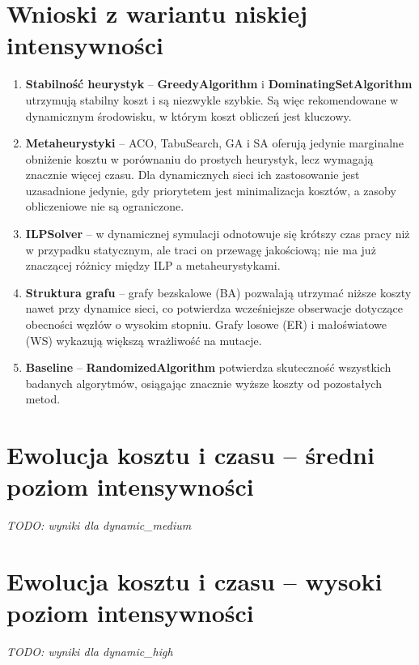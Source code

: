 \section{Wnioski z wariantu niskiej intensywności}

\begin{enumerate}
\item \textbf{Stabilność heurystyk} -- \textbf{GreedyAlgorithm} i \textbf{DominatingSetAlgorithm} utrzymują stabilny koszt i są niezwykle szybkie. Są więc rekomendowane w dynamicznym środowisku, w którym koszt obliczeń jest kluczowy.

\item \textbf{Metaheurystyki} -- ACO, TabuSearch, GA i SA oferują jedynie marginalne obniżenie kosztu w porównaniu do prostych heurystyk, lecz wymagają znacznie więcej czasu. Dla dynamicznych sieci ich zastosowanie jest uzasadnione jedynie, gdy priorytetem jest minimalizacja kosztów, a zasoby obliczeniowe nie są ograniczone.

\item \textbf{ILPSolver} -- w dynamicznej symulacji odnotowuje się krótszy czas pracy niż w przypadku statycznym, ale traci on przewagę jakościową; nie ma już znaczącej różnicy między ILP a metaheurystykami.

\item \textbf{Struktura grafu} -- grafy bezskalowe (BA) pozwalają utrzymać niższe koszty nawet przy dynamice sieci, co potwierdza wcześniejsze obserwacje dotyczące obecności węzłów o wysokim stopniu. Grafy losowe (ER) i małoświatowe (WS) wykazują większą wrażliwość na mutacje.

\item \textbf{Baseline} -- \textbf{RandomizedAlgorithm} potwierdza skuteczność wszystkich badanych algorytmów, osiągając znacznie wyższe koszty od pozostałych metod.
\end{enumerate}

\section{Ewolucja kosztu i czasu -- średni poziom intensywności}

\emph{TODO: wyniki dla dynamic\_medium}

\section{Ewolucja kosztu i czasu -- wysoki poziom intensywności}

\emph{TODO: wyniki dla dynamic\_high}

